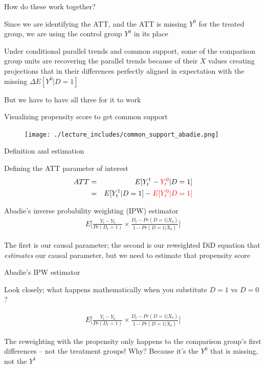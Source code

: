 \documentclass{beamer}
\begin{document}
\begin{frame}{How do these work together?}

Since we are identifying the ATT, and the ATT is missing $Y^0$ for the treated group, we are using the control group $Y^0$ in its place 

\bigskip

Under conditional parallel trends and common support, some of the comparison group units are recovering the parallel trends because of their $X$ values creating projections that in their differences perfectly aligned in expectation with the missing $\Delta E[Y^0|D=1]$

\bigskip

But we have to have all three for it to work

\end{frame}

\begin{frame}{Visualizing propensity score to get common support}

	\begin{figure}
	\texttt{[image: ./lecture\_includes/common\_support\_abadie.png]}
	\end{figure}

\end{frame}

\begin{frame}{Definition and estimation}

Defining the ATT parameter of interest
\begin{eqnarray*}
ATT &=& E[Y^1_t - \textcolor{red}{Y^0_t} |D=1] \\
&=&E[Y^1_t  | D = 1 ] - \textcolor{red}{E[Y^0_t | D=1]}
\end{eqnarray*}

\bigskip
Abadie's inverse probability weighting (IPW) estimator
\begin{eqnarray*}
E\bigg [ \frac{Y_t - Y_b}{Pr(D_t=1)} \times \frac{D_t - Pr(D=1|X_b)}{1-Pr(D=1|X_b)} \bigg ]
\end{eqnarray*}

\bigskip

The first is our causal parameter; the second is our reweighted DiD equation that \emph{estimates} our causal parameter, but we need to estimate that propensity score


\end{frame}

\begin{frame}{Abadie's IPW estimator}

Look closely; what happens mathematically when you substitute $D=1$ vs $D=0$?

\begin{eqnarray*}
E\bigg [ \frac{Y_t - Y_b}{Pr(D_t=1)} \times \frac{D_t - Pr(D=1|X_b)}{1-Pr(D=1|X_b)} \bigg ]
\end{eqnarray*}

\bigskip

The reweighting with the propensity only happens to the comparison group's first differences -- not the treatment groups!  Why?  Because it's the $Y^0$ that is missing, not the $Y^1$

\end{frame}
\end{document}

